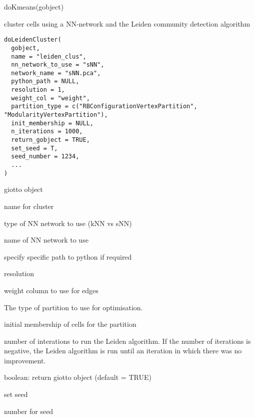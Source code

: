 \documentclass[a4paper]{book}
\begin{document}
%
\begin{Examples}
\begin{ExampleCode}
    doKmeans(gobject)
\end{ExampleCode}
\end{Examples}
%
\begin{Description}\relax
cluster cells using a NN-network and the Leiden community detection algorithm
\end{Description}
%
\begin{Usage}
\begin{verbatim}
doLeidenCluster(
  gobject,
  name = "leiden_clus",
  nn_network_to_use = "sNN",
  network_name = "sNN.pca",
  python_path = NULL,
  resolution = 1,
  weight_col = "weight",
  partition_type = c("RBConfigurationVertexPartition", "ModularityVertexPartition"),
  init_membership = NULL,
  n_iterations = 1000,
  return_gobject = TRUE,
  set_seed = T,
  seed_number = 1234,
  ...
)
\end{verbatim}
\end{Usage}
%
\begin{Arguments}
\begin{ldescription}
\item[\code{gobject}] giotto object

\item[\code{name}] name for cluster

\item[\code{nn\_network\_to\_use}] type of NN network to use (kNN vs sNN)

\item[\code{network\_name}] name of NN network to use

\item[\code{python\_path}] specify specific path to python if required

\item[\code{resolution}] resolution

\item[\code{weight\_col}] weight column to use for edges

\item[\code{partition\_type}] The type of partition to use for optimisation.

\item[\code{init\_membership}] initial membership of cells for the partition

\item[\code{n\_iterations}] number of interations to run the Leiden algorithm.
If the number of iterations is negative, the Leiden algorithm is run until
an iteration in which there was no improvement.

\item[\code{return\_gobject}] boolean: return giotto object (default = TRUE)

\item[\code{set\_seed}] set seed

\item[\code{seed\_number}] number for seed
\end{ldescription}
\end{Arguments}
\end{document}
